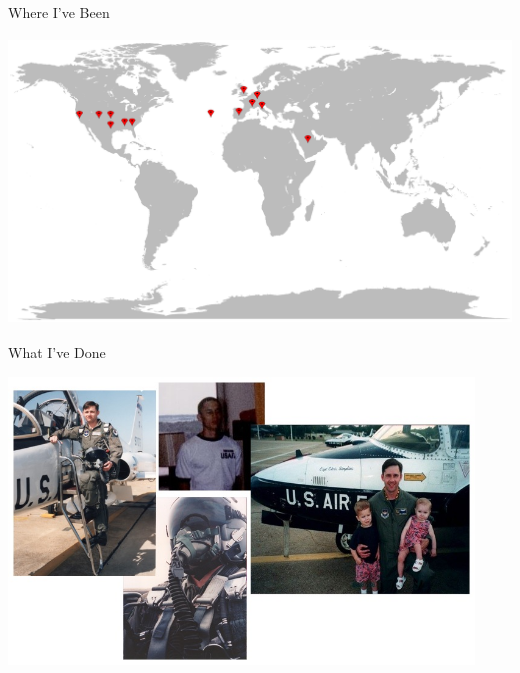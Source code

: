 \documentclass{beamer}
\begin{document}
\begin{frame}[fragile]{Where I've Been}

\begin{center}
\includegraphics[height=3in]{pin-world.png}
\end{center}


\end{frame}

\begin{frame}[fragile]{What I've Done}

\begin{center}
\includegraphics[height=3in]{chris-usaf.jpg}
\end{center}


\end{frame}
\end{document}
